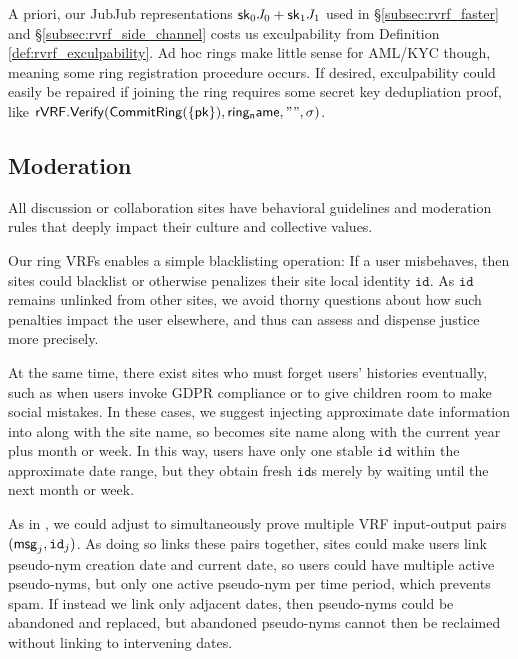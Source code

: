 \smallskip

A priori, our JubJub representations $\mathsf{sk}_0 J_0 + \mathsf{sk}_1 J_1$
used in \S\ref{subsec:rvrf_faster} and \S\ref{subsec:rvrf_side_channel}
costs us exculpability from Definition \ref{def:rvrf_exculpability}.
Ad hoc rings make little sense for AML/KYC though, meaning some ring
registration procedure occurs.
%
If desired, exculpability could easily be repaired if joining the ring
requires some secret key dedupliation proof, like 
${\mathsf{rVRF}}.{\mathsf{Verify}}({\mathsf{CommitRing}}(\{\mathsf{pk}\}),\mathsf{ring_name},\mathtt{""},\sigma)$.



\subsection{Moderation}
\label{subsec:moderation}

All discussion or collaboration sites have behavioral guidelines and
moderation rules that deeply impact their culture and collective values.

Our ring VRFs enables a simple blacklisting operation:
If a user misbehaves, then sites could blacklist or otherwise penalizes
their site local identity $\mathtt{id}$.
As $\mathtt{id}$ remains unlinked from other sites, we avoid thorny
questions about how such penalties impact the user elsewhere, and thus
can assess and dispense justice more precisely. 

At the same time, there exist sites who must forget users' histories
eventually, such as when users invoke GDPR compliance or to give children
room to make social mistakes.  In these cases, we suggest injecting
approximate date information into \msg along with the site name,
so \msg becomes site name along with the current year plus month or week.
In this way, users have only one stable $\mathtt{id}$ within the
approximate date range, but they obtain fresh $\mathtt{id}$s merely
by waiting until the next month or week.

As in \cite{PrivacyPass}, we could adjust \PedVRF to simultaneously
prove multiple VRF input-output pairs $(\mathsf{msg}_j,\mathtt{id}_j)$.
As doing so links these pairs together, sites could make users link
pseudo-nym creation date and current date, so users could have multiple
active pseudo-nyms, but only one active pseudo-nym per time period,
which prevents spam.
If instead we link only adjacent dates, then pseudo-nyms could
be abandoned and replaced, but abandoned pseudo-nyms cannot then
be reclaimed without linking to intervening dates.

